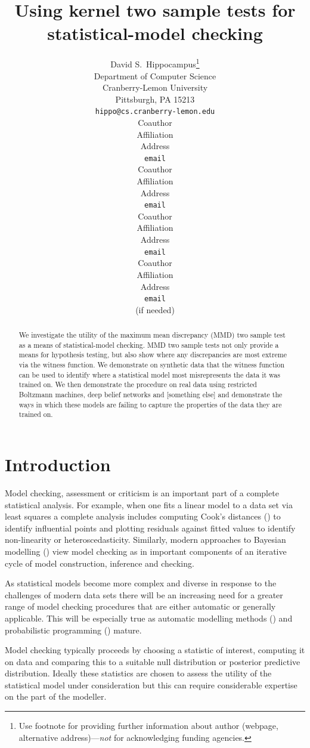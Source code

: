 \documentclass{article} %
\title{Using kernel two sample tests for\\statistical-model checking}
\author{
David S.~Hippocampus\thanks{ Use footnote for providing further information
about author (webpage, alternative address)---\emph{not} for acknowledging
funding agencies.} \\
Department of Computer Science\\
Cranberry-Lemon University\\
Pittsburgh, PA 15213 \\
\texttt{hippo@cs.cranberry-lemon.edu} \\
\And
Coauthor \\
Affiliation \\
Address \\
\texttt{email} \\
\AND
Coauthor \\
Affiliation \\
Address \\
\texttt{email} \\
\And
Coauthor \\
Affiliation \\
Address \\
\texttt{email} \\
\And
Coauthor \\
Affiliation \\
Address \\
\texttt{email} \\
(if needed)\\
}
\begin{document}
 

\maketitle

\begin{abstract} 
We investigate the utility of the maximum mean discrepancy (MMD) two sample test as a means of statistical-model checking.
MMD two sample tests not only provide a means for hypothesis testing, but also show where any discrepancies are most extreme via the witness function.
We demonstrate on synthetic data that the witness function can be used to identify where a statistical model most misrepresents the data it was trained on.
We then demonstrate the procedure on real data using restricted Boltzmann machines, deep belief networks and [something else] and demonstrate the ways in which these models are failing to capture the properties of the data they are trained on.
\end{abstract} 

\allowdisplaybreaks

\section{Introduction}

Model checking, assessment or criticism is an important part of a complete statistical analysis.
For example, when one fits a linear model to a data set via least squares a complete analysis includes computing Cook's distances () to identify influential points and plotting residuals against fitted values to identify non-linearity or heteroscedasticity.
Similarly, modern approaches to Bayesian modelling () view model checking as in important components of an iterative cycle of model construction, inference and checking.

As statistical models become more complex and diverse in response to the challenges of modern data sets there will be an increasing need for a greater range of model checking procedures that are either automatic or generally applicable.
This will be especially true as automatic modelling methods () and probabilistic programming () mature.

Model checking typically proceeds by choosing a statistic of interest, computing it on data and comparing this to a suitable null distribution or posterior predictive distribution.
Ideally these statistics are chosen to assess the utility of the statistical model under consideration but this can require considerable expertise on the part of the modeller.
\end{document}
